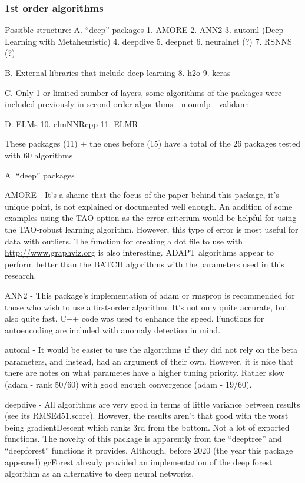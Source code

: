 \hypertarget{st-order-algorithms}{%
\subsubsection{1st order algorithms}\label{st-order-algorithms}}

Possible structure: A. ``deep'' packages 1. AMORE 2. ANN2 3. automl
(Deep Learning with Metaheuristic) 4. deepdive 5. deepnet 6. neuralnet
(?) 7. RSNNS (?)

B. External libraries that include deep learning 8. h2o 9. keras

C. Only 1 or limited number of layers, some algorithms of the packages
were included previously in second-order algorithms - monmlp - validann

D. ELMs 10. elmNNRcpp 11. ELMR

These packages (11) + the ones before (15) have a total of the 26
packages tested with 60 algorithms

A. ``deep'' packages

AMORE - It's a shame that the focus of the paper behind this package,
it's unique point, is not explained or documented well enough. An
addition of some examples using the TAO option as the error criterium
would be helpful for using the TAO-robust learning algorithm. However,
this type of error is most useful for data with outliers. The function
for creating a dot file to use with \url{http://www.graphviz.org} is
also interesting. ADAPT algorithms appear to perform better than the
BATCH algorithms with the parameters used in this research.

ANN2 - This package's implementation of adam or rmsprop is recommended
for those who wish to use a first-order algorithm. It's not only quite
accurate, but also quite fast. C++ code was used to enhance the speed.
Functions for autoencoding are included with anomaly detection in mind.

automl - It would be easier to use the algorithms if they did not rely
on the beta parameters, and instead, had an argument of their own.
However, it is nice that there are notes on what parametes have a higher
tuning priority. Rather slow (adam - rank 50/60) with good enough
convergence (adam - 19/60).

deepdive - All algorithms are very good in terms of little variance
between results (see its RMSEd51.score). However, the results aren't
that good with the worst being gradientDescent which ranks 3rd from the
bottom. Not a lot of exported functions. The novelty of this package is
apparently from the ``deeptree'' and ``deepforest'' functions it
provides. Although, before 2020 (the year this package appeared)
gcForest already provided an implementation of the deep forest algorithm
as an alternative to deep neural networks.

